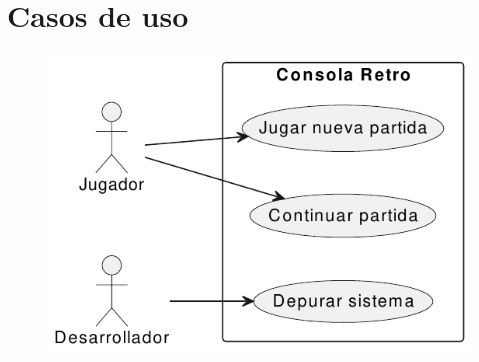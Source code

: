 \documentclass[11pt,a4paper]{article}
\begin{document}
\section{Casos de uso}

\begin{figure}[htpb]
\centering 
\includegraphics[width=.60\textwidth]{../Figuras/casos_uso.pdf}
\label{fig:diagCasosUso}
\end{figure}
\end{document}
